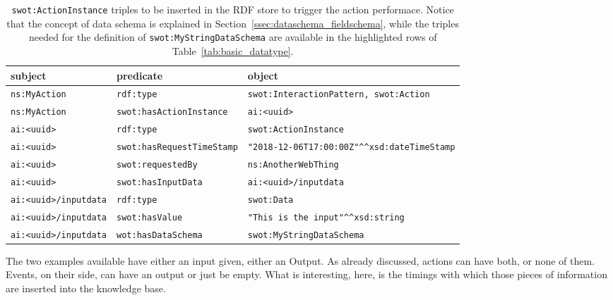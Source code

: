 \begin{table*}[t]
\centering
\footnotesize
\caption{\texttt{swot:ActionInstance} triples to be inserted in the RDF store to trigger the action performace. Notice that the concept of data schema is explained in Section~\ref{ssec:dataschema_fieldschema}, while the triples needed for the definition of \texttt{swot:MyStringDataSchema} are available in the highlighted rows of Table~\ref{tab:basic_datatype}.}
\label{tab:action_instance}
\begin{tabular}{lll}
\textbf{subject}           & \textbf{predicate}           & \textbf{object}           \\ \hline
\texttt{ns:MyAction}       & \texttt{rdf:type}            & \texttt{swot:InteractionPattern, swot:Action}  \\ \hline
\texttt{ns:MyAction}       & \texttt{swot:hasActionInstance}   & \texttt{ai:<uuid>} \\ \hline
\texttt{ai:<uuid>} & \texttt{rdf:type} & \texttt{swot:ActionInstance}  \\ \hline
\texttt{ai:<uuid>} & \texttt{swot:hasRequestTimeStamp} & \texttt{"2018-12-06T17:00:00Z"\textasciicircum \textasciicircum xsd:dateTimeStamp}  \\ \hline
\texttt{ai:<uuid>}& \texttt{swot:requestedBy} & \texttt{ns:AnotherWebThing}   \\ \hline
\texttt{ai:<uuid>}& \texttt{swot:hasInputData} & \texttt{ai:<uuid>/inputdata}   \\ \hline
\texttt{ai:<uuid>/inputdata}& \texttt{rdf:type} & \texttt{swot:Data}   \\ \hline
\texttt{ai:<uuid>/inputdata}& \texttt{swot:hasValue}  & \texttt{"This is the input"\textasciicircum \textasciicircum xsd:string} \\ \hline
\texttt{ai:<uuid>/inputdata} & \texttt{wot:hasDataSchema} & \texttt{swot:MyStringDataSchema}\\ \hline
\end{tabular}
\end{table*}

The two examples available have either an input given, either an Output. As already discussed, actions can have both, or none of them. Events, on their side, can have an output or just be empty. What is interesting, here, is the timings with which those pieces of information are inserted into the knowledge base.

